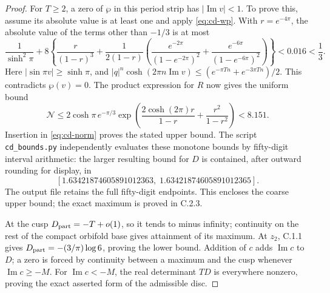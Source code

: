 \begin{proof}
For \(T\geq2\), a zero of \(\wp\) in this period strip has
\(|\operatorname{Im}v|<1\). To prove this, assume its absolute value is at
least one and apply \eqref{eq:cd-wp}. With \(r=e^{-4\pi}\), the absolute
value of the terms other than \(-1/3\) is at most
\[
 \frac1{\sinh^2\pi}+8\left\{
 \frac r{(1-r)^3}+\frac1{2(1-r)}
 \left(\frac{e^{-2\pi}}{(1-e^{-2\pi})^2}
 +\frac{e^{-6\pi}}{(1-e^{-6\pi})^2}\right)\right\}<0.016<\frac13.
\]
Here \(|\sin\pi v|\geq\sinh\pi\), and
\(|q|^n\cosh(2\pi n\operatorname{Im}v)\leq
(e^{-\pi Tn}+e^{-3\pi Tn})/2\). This contradicts \(\wp(v)=0\).
The product expression for \(R\) now gives the uniform bound
\[
 \mathcal N\leq2\cosh\pi\,e^{-\pi/3}
 \exp\left(\frac{2\cosh(2\pi)r}{1-r}+\frac{r^2}{1-r^2}\right)
 <8.151.
\]
Insertion in \eqref{eq:cd-norm} proves the stated upper bound. The script
\texttt{cd\_bounds.py} independently evaluates these monotone bounds by
fifty-digit interval arithmetic: the larger resulting bound for \(D\) is
contained, after outward rounding for display, in
\[
 [1.63421874605891012363,\;1.63421874605891012365].
\]
The output file retains the full fifty-digit endpoints.
This encloses the coarse upper bound; the exact maximum is proved in C.2.3.

At the cusp \(D_{\rm part}=-T+o(1)\), so it tends to minus infinity;
continuity on the rest of the compact orbifold base gives attainment of
its maximum. At \(z_2\), C.1.1 gives
\(D_{\rm part}=-(3/\pi)\log6\), proving the lower bound. Addition of \(c\)
adds \(\operatorname{Im}c\) to \(D\); a zero is forced by continuity
between a maximum and the cusp whenever \(\operatorname{Im}c\geq-M\).
For \(\operatorname{Im}c<-M\), the real determinant \(TD\) is everywhere
nonzero, proving the exact asserted form of the admissible disc.
\end{proof}

